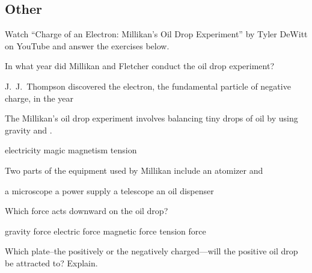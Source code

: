 \documentclass[]{exam}
\begin{document}
\clearpage

\subsection{Other}   
\begin{questions}

\question
Watch ``Charge of an Electron: Millikan's Oil Drop Experiment'' by Tyler DeWitt on YouTube 
and answer the exercises below.

\question
In what year did Millikan and Fletcher conduct the oil drop experiment?

\begin{randomizechoices}
\end{randomizechoices}

\question
J.~J.~Thompson discovered the electron, the fundamental particle of negative charge, in the year \fillin[][3cm]

\begin{randomizechoices}
\end{randomizechoices}

\question
The Millikan's oil drop experiment involves balancing tiny drops of oil by using gravity and \fillin[][3cm].

\begin{randomizechoices}
    \correctchoice electricity
    \choice magic
    \choice magnetism
    \choice tension
\end{randomizechoices}

\question
Two parts of the equipment used by Millikan include an atomizer and 

\begin{randomizechoices}
    \correctchoice a microscope
    \choice a power supply
    \choice a telescope
    \choice an oil dispenser
\end{randomizechoices}

\question
Which force acts downward on the oil drop?

\begin{randomizechoices}
    \correctchoice gravity force
    \choice electric force
    \choice magnetic force
    \choice tension force
\end{randomizechoices}

\question
Which plate--the positively or the negatively charged---will the positive oil drop be attracted to? Explain.


\end{questions}
\end{document}
